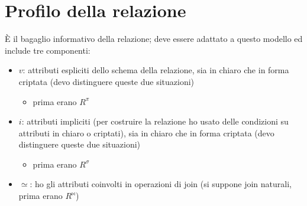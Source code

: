 \documentclass{report}
\begin{document}
\section{Profilo della relazione}
È il bagaglio informativo della relazione; deve essere adattato a questo modello ed include tre componenti:
\begin{itemize}
    \item $v$: attributi espliciti dello schema della relazione, sia in chiaro che in forma criptata (devo distinguere queste due situazioni)
    \begin{itemize}
        \item prima erano $R^\pi$
    \end{itemize}
    \item $i$: attributi impliciti (per costruire la relazione ho usato delle condizioni su attributi in chiaro o criptati), sia in chiaro che in forma criptata (devo distinguere queste due situazioni) 
    \begin{itemize}
        \item prima erano $R^\sigma$
    \end{itemize}
    \item $\simeq$: ho gli attributi coinvolti in operazioni di join (si suppone join naturali, prima erano $R^{\bowtie}$)
\end{itemize}
\end{document}
